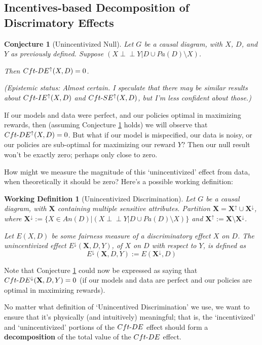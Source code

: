\documentclass[letterpaper,10pt]{article}
\newtheorem{conjecture}{Conjecture}
\newtheorem{workdefinition}{Working Definition}
\newcommand\indep{\perp \!\!\! \perp}
\begin{document}
\subsection{Incentives-based Decomposition of Discrimatory Effects}
\begin{conjecture}[Unincentivized Null]\label{null-conj}
Let $G$ be a causal diagram, with $X$, $D$, and $Y$ as previously defined. Suppose $(X\indep Y | D \cup Pa(D) \setminus X)$.

Then $Cft{\text -}DE^\uparrow (X,D) = 0$.

(Epistemic status: Almost certain. I speculate that there may be similar results about $Cft{\text -}IE^\uparrow (X,D)$ and $Cft{\text -}SE^\uparrow (X,D)$, but I'm less confident about those.)
\end{conjecture}

If our models and data were perfect, and our policies optimal in maximizing rewards, then (assuming Conjecture \ref{null-conj} holds) we will observe that $Cft{\text -}DE^\uparrow (X,D) = 0$. But what if our model is mispecified, our data is noisy, or our policies are sub-optimal for maximizing our reward $Y$? Then our null result won't be exactly zero; perhaps only close to zero.

How might we measure the magnitude of this `unincentivized' effect from data, when theoretically it should be zero? Here's a possible working definition:

\begin{workdefinition}[Unincentivized Discrimination]
Let $G$ be a causal diagram, with $\mathbf{X}$ containing multiple sensitive attributes. Partition $\mathbf{X}=\mathbf{X}^\uparrow\cup \mathbf{X}^\downarrow$, where $\mathbf{X}^\downarrow:=\{X\in An(D)| (X\indep Y | D \cup Pa(D) \setminus X)\}$ and $\mathbf{X}^\uparrow:=\mathbf{X}\setminus\mathbf{X}^\downarrow$. 

Let $E(X,D)$ be some fairness measure of a discriminatory effect $X$ on $D$. The \emph{unincentivized effect} $E^\downarrow(\mathbf{X},D,Y)$, of $X$ on $D$ with respect to $Y$, is defined as
\[
E^\downarrow(\mathbf{X},D,Y) := E(\mathbf{X}^\downarrow,D)
\] 
\end{workdefinition}

Note that Conjecture \ref{null-conj} could now be expressed as saying that $Cft{\text -}DE^\downarrow(\mathbf{X},D,Y)=0$ (if our models and data are perfect and our policies are optimal in maximizing rewards).


No matter what definition of `Unincentived Discrimination' we use, we want to ensure that it's physically (and intuitively) meaningful; that is, the `incentivized' and `unincentivized' portions of the $Cft{\text -}DE$ effect should form a \textbf{decomposition} of the total value of the $Cft{\text -}DE$ effect.
\end{document}
